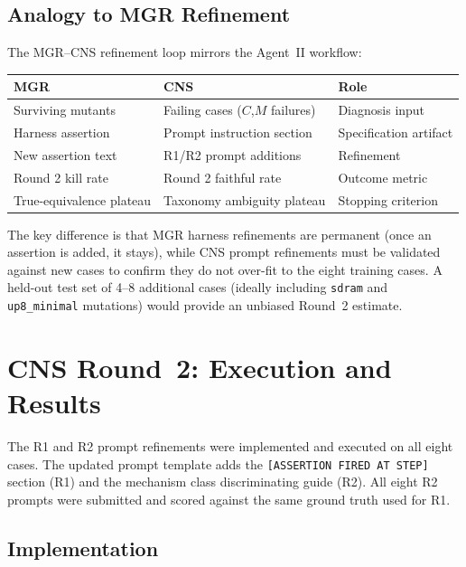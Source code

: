 \documentclass[11pt,a4paper]{article}
\begin{document}
\subsection{Analogy to MGR Refinement}

The MGR--CNS refinement loop mirrors the Agent~II workflow:

\begin{center}
\begin{tabular}{lll}
\toprule
\textbf{MGR} & \textbf{CNS} & \textbf{Role} \\
\midrule
Surviving mutants & Failing cases ($C$,$M$ failures) & Diagnosis input \\
Harness assertion & Prompt instruction section & Specification artifact \\
New assertion text & R1/R2 prompt additions & Refinement \\
Round 2 kill rate & Round 2 faithful rate & Outcome metric \\
True-equivalence plateau & Taxonomy ambiguity plateau & Stopping criterion \\
\bottomrule
\end{tabular}
\end{center}

The key difference is that MGR harness refinements are permanent (once an
assertion is added, it stays), while CNS prompt refinements must be validated
against new cases to confirm they do not over-fit to the eight training cases.
A held-out test set of 4--8 additional cases (ideally including \texttt{sdram}
and \texttt{up8\_minimal} mutations) would provide an unbiased Round~2 estimate.

\section{CNS Round~2: Execution and Results}

The R1 and R2 prompt refinements were implemented and executed on all eight
cases. The updated prompt template adds the \texttt{[ASSERTION FIRED AT STEP]}
section (R1) and the mechanism class discriminating guide (R2). All eight R2
prompts were submitted and scored against the same ground truth used for R1.

\subsection{Implementation}
\end{document}
